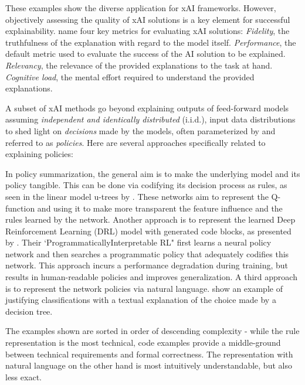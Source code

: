 \documentclass[twoside,11pt]{article}
\begin{document}
These examples show the diverse application for xAI frameworks. However, objectively assessing the quality of xAI solutions is a key element for successful explainability. \citet{milani2022survey} name four key metrics for evaluating xAI solutions: \emph{Fidelity}, the truthfulness of the explanation with regard to the model itself. \emph{Performance}, the default metric used to evaluate the success of the AI solution to be explained. \emph{Relevancy}, the relevance of the provided explanations to the task at hand. \emph{Cognitive load}, the mental effort required to understand the provided explanations.


A subset of xAI methods go beyond explaining outputs of feed-forward models assuming \emph{independent and identically distributed} (i.i.d.), input data distributions to shed light on \emph{decisions} made by the models, often parameterized by and referred to as \emph{policies}. Here are several approaches specifically related to explaining policies: 


In policy summarization, the general aim is to make the underlying model and its policy tangible. This can be done via codifying its decision process as rules, as seen in the linear model u-trees by \citet{LiuEtAl:2018:LinearModelUTrees}. These networks aim to represent the Q-function and using it to make more transparent the feature influence and the rules learned by the network. 
Another approach is to represent the learned Deep Reinforcement Learning (DRL) model with generated code blocks, as presented by \citet{VermaEtAl:2018:ProgrammaticallyInterpretableRL}. Their `ProgrammaticallyInterpretable RL" first learns a neural policy network and then searches a programmatic policy that adequately codifies this network. This approach incurs a performance degradation during training, but results in human-readable policies and improves generalization.
A third approach is to represent the network policies via natural language. \citet{AlonsoEtAl:2018:xAINLBeerClassifier} show an example of justifying classifications with a textual explanation of the choice made by a decision tree. 

The examples shown are sorted in order of descending complexity - while the rule representation is the most technical, code examples provide a middle-ground between technical requirements and formal correctness. The representation with natural language on the other hand is most intuitively understandable, but also less exact.
\end{document}

